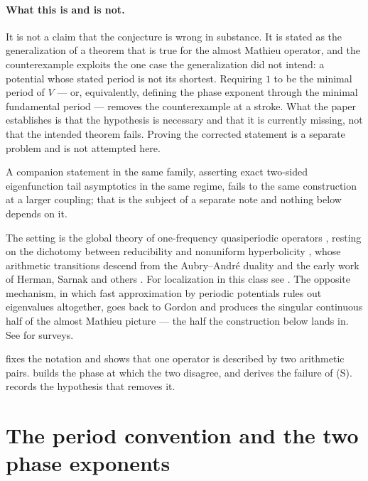 \documentclass[11pt,reqno]{amsart}
\theoremstyle{plain}
\theoremstyle{definition}
\theoremstyle{remark}
\numberwithin{equation}{section}
\begin{document}
\paragraph{What this is and is not.} It is not a claim that the conjecture is
wrong in substance. It is stated as the generalization of a theorem that is
true for the almost Mathieu operator, and the counterexample exploits the one
case the generalization did not intend: a potential whose stated period is not
its shortest. Requiring $1$ to be the minimal period of $V$ --- or,
equivalently, defining the phase exponent through the minimal fundamental
period --- removes the counterexample at a stroke. What the paper establishes
is that the hypothesis is necessary and that it is currently missing, not that
the intended theorem fails. Proving the corrected statement is a separate
problem and is not attempted here.

A companion statement in the same family, asserting exact two-sided
eigenfunction tail asymptotics in the same regime, fails to the same
construction at a larger coupling; that is the subject of a separate note and
nothing below depends on it.

The setting is the global theory of one-frequency quasiperiodic operators
\cite{Avila_2015gt,Avila_2017sp,Avila_2009tt,Avila_2009al,Avila_2011ak},
resting on the dichotomy between reducibility and nonuniform hyperbolicity
\cite{Avila_2006ro}, whose
arithmetic transitions descend from the Aubry--Andr\'e duality and the early
work of Herman, Sarnak and others
\cite{AubryAndre_1980ab,Herman_1983um,Sarnak_1982sb,Eliasson_1992fs}. For
localization in this class see
\cite{Jitomirskaya_1999mi,Jitomirskaya_1994al,Jitomirskaya_1998al,Bourgain_2000on,Bourgain_2002co,Bourgain_Book,Jitomirskaya_2016lr,Avila_2008ta,Liu_2015al,Ge_2023mj}.
The opposite mechanism, in which fast approximation by periodic potentials
rules out eigenvalues altogether, goes back to Gordon \cite{Gordon_1976ps} and
produces the singular continuous half of the almost Mathieu picture
\cite{Gordon_1997da,Jitomirskaya_1994ow} --- the half the construction below
lands in. See \cite{Damanik_2016so,Simon_2000so} for surveys.

 fixes the notation and shows that one operator is
described by two arithmetic pairs.  builds the phase at
which the two disagree, and  derives the failure of (S).
 records the hypothesis that removes it.

\section{The period convention and the two phase exponents}
\label{sec:convention}
\end{document}

